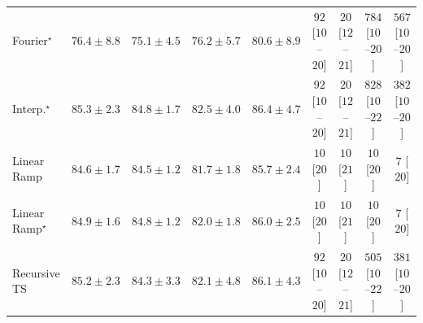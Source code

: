 \begin{tabular}{l|cccc|cccc|}
Fourier$^\star$ & {\cellcolor[HTML]{2484BA}} \color[HTML]{F1F1F1} $76.4\pm 8.8$ & {\cellcolor[HTML]{328DBF}} \color[HTML]{F1F1F1} $75.1\pm 4.5$ & {\cellcolor[HTML]{2685BB}} \color[HTML]{F1F1F1} $76.2\pm 5.7$ & {\cellcolor[HTML]{0569A4}} \color[HTML]{F1F1F1} $80.6\pm 8.9$ & {\cellcolor[HTML]{FDE4E1}} \color[HTML]{000000} $92$ [$10$--$20$] & {\cellcolor[HTML]{FFF4F0}} \color[HTML]{000000} $20$ [$12$--$21$] & {\cellcolor[HTML]{5D006F}} \color[HTML]{F1F1F1} $784$ [$10$--$20$] & {\cellcolor[HTML]{C71D8C}} \color[HTML]{F1F1F1} $567$ [$10$--$20$] \\
Interp.$^\star$ & {\cellcolor[HTML]{034D79}} \color[HTML]{F1F1F1} $85.3\pm 2.3$ & {\cellcolor[HTML]{03517E}} \color[HTML]{F1F1F1} $84.8\pm 1.7$ & {\cellcolor[HTML]{046096}} \color[HTML]{F1F1F1} $82.5\pm 4.0$ & {\cellcolor[HTML]{03456C}} \color[HTML]{F1F1F1} $86.4\pm 4.7$ & {\cellcolor[HTML]{FDE4E1}} \color[HTML]{000000} $92$ [$10$--$20$] & {\cellcolor[HTML]{FFF4F0}} \color[HTML]{000000} $20$ [$12$--$21$] & {\cellcolor[HTML]{49006A}} \color[HTML]{F1F1F1} $828$ [$10$--$22$] & {\cellcolor[HTML]{F87CA8}} \color[HTML]{F1F1F1} $382$ [$10$--$20$] \\
Linear Ramp & {\cellcolor[HTML]{045382}} \color[HTML]{F1F1F1} $84.6\pm 1.7$ & {\cellcolor[HTML]{045382}} \color[HTML]{F1F1F1} $84.5\pm 1.2$ & {\cellcolor[HTML]{04649D}} \color[HTML]{F1F1F1} $81.7\pm 1.8$ & {\cellcolor[HTML]{034A74}} \color[HTML]{F1F1F1} $85.7\pm 2.4$ & {\cellcolor[HTML]{FFF7F3}} \color[HTML]{000000} $10$ [$20$] & {\cellcolor[HTML]{FFF7F3}} \color[HTML]{000000} $10$ [$21$] & {\cellcolor[HTML]{FFF7F3}} \color[HTML]{000000} $10$ [$20$] & {\cellcolor[HTML]{FFF7F3}} \color[HTML]{000000} $7$ [$20$] \\
Linear Ramp$^\star$ & {\cellcolor[HTML]{03517E}} \color[HTML]{F1F1F1} $84.9\pm 1.6$ & {\cellcolor[HTML]{03517E}} \color[HTML]{F1F1F1} $84.8\pm 1.2$ & {\cellcolor[HTML]{046299}} \color[HTML]{F1F1F1} $82.0\pm 1.8$ & {\cellcolor[HTML]{034871}} \color[HTML]{F1F1F1} $86.0\pm 2.5$ & {\cellcolor[HTML]{FFF7F3}} \color[HTML]{000000} $10$ [$20$] & {\cellcolor[HTML]{FFF7F3}} \color[HTML]{000000} $10$ [$21$] & {\cellcolor[HTML]{FFF7F3}} \color[HTML]{000000} $10$ [$20$] & {\cellcolor[HTML]{FFF7F3}} \color[HTML]{000000} $7$ [$20$] \\
Recursive TS & {\cellcolor[HTML]{034D79}} \color[HTML]{F1F1F1} $85.2\pm 2.3$ & {\cellcolor[HTML]{045585}} \color[HTML]{F1F1F1} $84.3\pm 3.3$ & {\cellcolor[HTML]{046299}} \color[HTML]{F1F1F1} $82.1\pm 4.8$ & {\cellcolor[HTML]{03476F}} \color[HTML]{F1F1F1} $86.1\pm 4.3$ & {\cellcolor[HTML]{FDE4E1}} \color[HTML]{000000} $92$ [$10$--$20$] & {\cellcolor[HTML]{FFF4F0}} \color[HTML]{000000} $20$ [$12$--$21$] & {\cellcolor[HTML]{E13B98}} \color[HTML]{F1F1F1} $505$ [$10$--$22$] & {\cellcolor[HTML]{F87CA8}} \color[HTML]{F1F1F1} $381$ [$10$--$20$] \\

\end{tabular}
